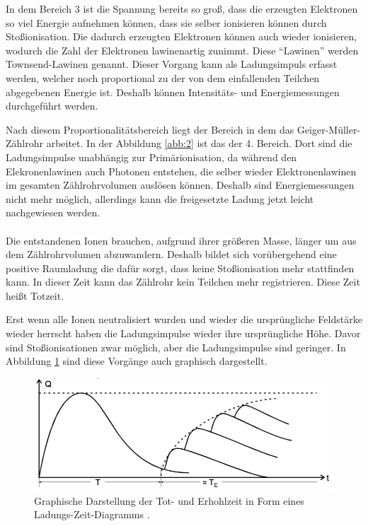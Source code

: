 In dem Bereich 3 ist die Spannung bereits so groß, dass die erzeugten Elektronen
so viel Energie aufnehmen können, dass sie selber ionisieren können durch Stoßionisation.
Die dadurch erzeugten Elektronen können auch wieder ionisieren, wodurch die Zahl der Elektronen
lawinenartig zunimmt. Diese \enquote{Lawinen} werden Townsend-Lawinen genannt. Dieser Vorgang
kann als Ladungsimpuls erfasst werden, welcher noch proportional zu der von dem
einfallenden Teilchen abgegebenen Energie ist. Deshalb können Intensitäts- und Energiemessungen
durchgeführt werden.

Nach diesem Proportionalitätsbereich liegt der Bereich in dem das Geiger-Müller-
Zählrohr arbeitet. In der Abbildung \ref{abb:2} ist das der 4. Bereich. Dort sind
die Ladungsimpulse unabhängig zur Primärionisation, da während den Elekronenlawinen
auch Photonen entstehen, die selber wieder Elektronenlawinen im gesamten Zählrohrvolumen
auslösen können. Deshalb sind Energiemessungen nicht mehr möglich, allerdings
kann die freigesetzte Ladung jetzt leicht nachgewiesen werden.\\\\


Die entstandenen Ionen brauchen, aufgrund ihrer größeren Masse, länger um aus dem
Zählrohrvolumen abzuwandern. Deshalb bildet sich vorübergehend eine positive Raumladung
die dafür sorgt, dass keine Stoßionisation mehr stattfinden kann. In dieser Zeit kann
das Zählrohr kein Teilchen mehr registrieren. Diese Zeit heißt Totzeit.

Erst wenn alle Ionen neutralisiert wurden und wieder die ursprüngliche Feldstärke wieder
herrscht haben die Ladungsimpulse wieder ihre ursprüngliche Höhe. Davor sind Stoßionisationen
zwar möglich, aber die Ladungsimpulse sind geringer. In Abbildung \ref{abb:3} sind diese
Vorgänge auch graphisch dargestellt.

\begin{figure}[H]
  \centering
  \includegraphics[width=\textwidth]{content/Totzeit.png}
  \caption{Graphische Darstellung der Tot- und Erhohlzeit in Form eines Ladungs-Zeit-Diagramms
  \cite{1}.}
  \label{abb:3}
\end{figure}


